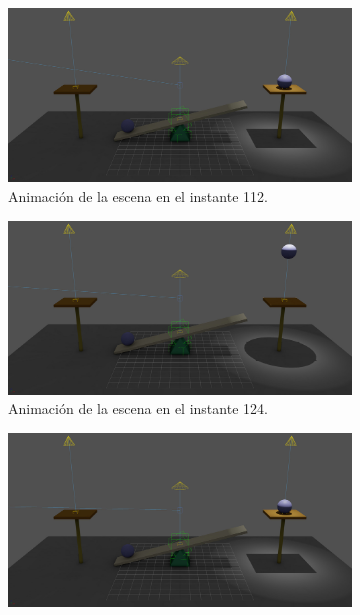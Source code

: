 \begin{figure}[H]\ContinuedFloat
   \begin{subfigure}[t]{0.48\textwidth}
      \centering
      \includegraphics[width=\textwidth]{imagenes/animaciones/general/112.jpg}
      \caption{Animación de la escena en el instante 112.}
   \end{subfigure}
  \hfill
   \begin{subfigure}[t]{0.48\textwidth}
      \centering
      \includegraphics[width=\textwidth]{imagenes/animaciones/general/124.jpg}
      \caption{Animación de la escena en el instante 124.}
   \end{subfigure}
   \par\bigskip   
 \begin{subfigure}[t]{0.48\textwidth}
    \centering
    \includegraphics[width=\textwidth]{imagenes/animaciones/general/136.jpg}

\end{subfigure}
\end{figure}
